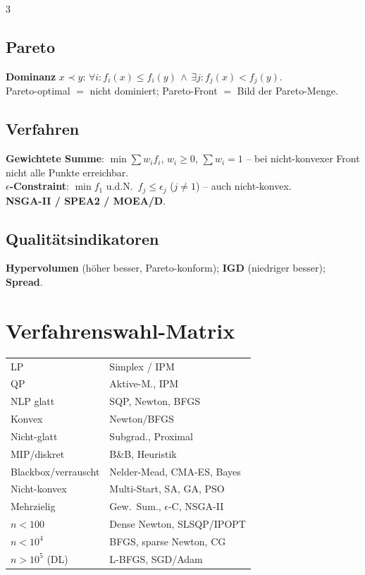\documentclass[8pt,a4paper]{extarticle}
\begin{document}
\begin{multicols*}{3}
\subsection{Pareto}
\textbf{Dominanz} $x\prec y$: $\forall i\!:f_i(x)\!\le\!f_i(y)\,\wedge\,\exists j\!:f_j(x)\!<\!f_j(y)$.\\
Pareto-optimal $=$ nicht dominiert; Pareto-Front $=$ Bild der Pareto-Menge.

\subsection{Verfahren}
\textbf{Gewichtete Summe}: $\min\sum w_i f_i$, $w_i\!\ge\!0$, $\sum w_i{=}1$ -- bei nicht-konvexer Front nicht alle Punkte erreichbar.\\
\textbf{$\epsilon$-Constraint}: $\min f_1$ u.d.N.\ $f_j\!\le\!\epsilon_j$ ($j\ne 1$) -- auch nicht-konvex.\\
\textbf{NSGA-II / SPEA2 / MOEA/D}.

\subsection{Qualit\"atsindikatoren}
\textbf{Hypervolumen} (h\"oher besser, Pareto-konform); \textbf{IGD} (niedriger besser); \textbf{Spread}.

\section{Verfahrenswahl-Matrix}
\begin{tabularx}{\linewidth}{@{}l@{\ \,}X@{}}
LP & Simplex / IPM \\
QP & Aktive-M., IPM \\
NLP glatt & SQP, Newton, BFGS \\
Konvex & Newton/BFGS \\
Nicht-glatt & Subgrad., Proximal \\
MIP/diskret & B\&B, Heuristik \\
Blackbox/verrauscht & Nelder-Mead, CMA-ES, Bayes \\
Nicht-konvex & Multi-Start, SA, GA, PSO \\
Mehrzielig & Gew.\ Sum., $\epsilon$-C, NSGA-II \\
$n\!<\!100$ & Dense Newton, SLSQP/IPOPT \\
$n\!<\!10^4$ & BFGS, sparse Newton, CG \\
$n\!>\!10^5$ (DL) & L-BFGS, SGD/Adam \\
\end{tabularx}


\end{multicols*}
\end{document}
